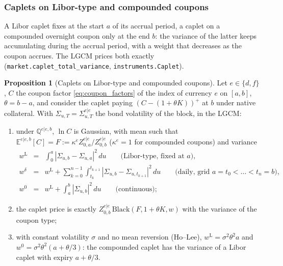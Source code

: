 \documentclass[11pt,english]{amsart}
\newcommand{\EE}{\mathbb{E}}
\newcommand{\QQ}{\mathbb{Q}}
\theoremstyle{definition}
\newtheorem{prop}{Proposition}
\begin{document}
\subsubsection{Caplets on Libor-type and compounded coupons}\label{sssec:lgcm_caplets}
A Libor caplet fixes at the start $a$ of its accrual period, a caplet on a compounded overnight coupon only at the end $b$: the variance of the latter keeps accumulating during the accrual period, with a weight that decreases as the coupon accrues. The LGCM prices both exactly (\texttt{market.caplet\_total\_variance}, \texttt{instruments.Caplet}).

\begin{prop}[Caplets on Libor-type and compounded coupons]\label{prop:lgcm_caplet}
Let $e\in\{d,f\}$, $C$ the coupon factor \eqref{eq:coupon_factors} of the index of currency $e$ on $[a,b]$, $\theta = b-a$, and consider the caplet paying $\left(C - (1+\theta K)\right)^+$ at $b$ under native collateral. With $\Sigma_{u,T} = \Sigma^{e|e}_{u,T}$ the bond volatility of the block, in the LGCM:
\begin{enumerate}
\item under $\QQ^{e|e,b}$, $\ln C$ is Gaussian, with mean such that $\EE^{e|e,b}[C] = F := \kappa^e Z^{e|e}_{0,a}/Z^{e|e}_{0,b}$ ($\kappa^e = 1$ for compounded coupons) and variance
\begin{eqnarray}
  w^{\mathrm{L}} &=& \int_0^a |\Sigma_{u,b}-\Sigma_{u,a}|^2\,du \qquad \textrm{(Libor-type, fixed at $a$)}, \nonumber\\
  w^{\delta} &=& w^{\mathrm{L}} + \sum_{k=0}^{n-1}\int_{t_k}^{t_{k+1}} |\Sigma_{u,b}-\Sigma_{u,t_{k+1}}|^2\,du \qquad \textrm{(daily, grid $a = t_0<\ldots<t_n = b$)}, \label{eq:lgcm_caplet_variance}\\
  w^{0} &=& w^{\mathrm{L}} + \int_a^b |\Sigma_{u,b}|^2\,du \qquad \textrm{(continuous)}; \nonumber
\end{eqnarray}
\item the caplet price is exactly $Z^{e|e}_{0,b}\,\mathrm{Black}\left(F, 1+\theta K, w\right)$ with the variance of the coupon type;
\item with constant volatility $\sigma$ and no mean reversion (Ho--Lee), $w^{\mathrm{L}} = \sigma^2\theta^2a$ and $w^0 = \sigma^2\theta^2(a+\theta/3)$: the compounded caplet has the variance of a Libor caplet with expiry $a + \theta/3$.
\end{enumerate}
\end{prop}
\end{document}
